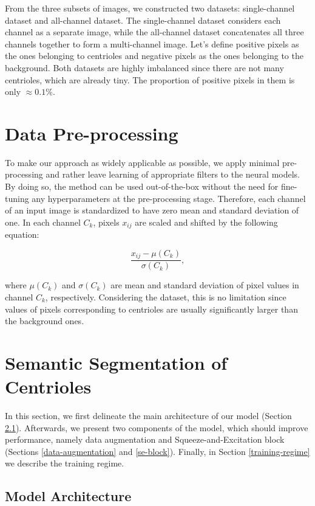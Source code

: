 \documentclass[9pt,conference,compsocconf, article]{IEEEtran}
\begin{document}
From the three subsets of images, we constructed two datasets: single-channel dataset and all-channel dataset. The single-channel dataset considers each channel as a separate image, while the all-channel dataset concatenates all three channels together to form a multi-channel image. Let's define positive pixels as the ones belonging to centrioles and negative pixels as the ones belonging to the background. Both datasets are highly imbalanced since there are not many centrioles, which are already tiny. The proportion of positive pixels in them is only $\approx 0.1\%$.


\section{Data Pre-processing}

To make our approach as widely applicable as possible, we apply minimal pre-processing and rather leave learning of appropriate filters to the neural models. By doing so, the method can be used out-of-the-box without the need for fine-tuning any hyperparameters at the pre-processing stage. Therefore, each channel of an input image is standardized to have zero mean and standard deviation of one. In each channel $C_k$, pixels $x_{ij}$ are scaled and shifted by the following equation:

\begin{equation}
    \frac{x_{ij} - \mu(C_k)}{\sigma(C_k)},
\end{equation}

\noindent 
where $\mu(C_k)$ and $\sigma(C_k)$ are mean and standard deviation of pixel values in channel $C_k$, respectively. Considering the dataset, this is no limitation since values of pixels corresponding to centrioles are usually significantly larger than the background ones.


\section{Semantic Segmentation of Centrioles} 

In this section, we first delineate the main architecture of our model (Section \ref{model-architecture}). Afterwards, we present two components of the model, which should improve performance, namely data augmentation and Squeeze-and-Excitation block (Sections \ref{data-augmentation} and \ref{se-block}). Finally, in Section \ref{training-regime} we describe the training regime.

\subsection{Model Architecture}
\label{model-architecture}
\end{document}
